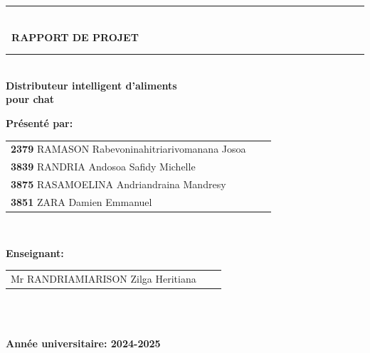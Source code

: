 \documentclass[a4paper,12pt]{report}
\begin{document}
\begin{titlepage}
\begin{center}
\rule{\linewidth}{0.2mm} \\[0.4cm]
{ \bfseries\ RAPPORT DE PROJET \\[0.1cm] }
\rule{\linewidth}{0.2mm} \\[3cm]



\textsc{\huge}
{\huge \bfseries\color{blue}  Distributeur intelligent
d’aliments\\ pour chat  \\[4cm] }



\begin{minipage}{0.8\textwidth}
  \begin{flushleft} \large
   \begin{center}
    \large \textbf{Présenté par:}\\[0.3cm]
    		\begin{tabular}{l@{\hskip 1cm}l@{\hskip 1cm}l}
				 \textbf{2379} \textsc{RAMASON} Rabevoninahitriarivomanana Josoa\\
				  \textbf{3839} \textsc{RANDRIA} Andosoa Safidy Michelle  \\
				   \textbf{3875} \textsc{RASAMOELINA} Andriandraina Mandresy    \\
				   \textbf{3851} \textsc{ZARA} Damien Emmanuel    \\
			\end{tabular}\\[1cm]
	\end{center}
	\begin{center}
    \large \textbf{Enseignant:}\\[2mm]
    		\begin{tabular}{l@{\hskip 1cm}l@{\hskip 1cm}l}
				Mr \textsc{RANDRIAMIARISON} Zilga Heritiana     \\
			\end{tabular}\\[1cm]
    	
    	\end{center}



  \end{flushleft}
\end{minipage}%
\begin{minipage}{0.8\textwidth}
  
\end{minipage}\\[1.8cm]



{\textbf{\large {Année universitaire:} 2024-2025}}

\end{center}
\end{titlepage}

\null\newpage

 
\end{document}

